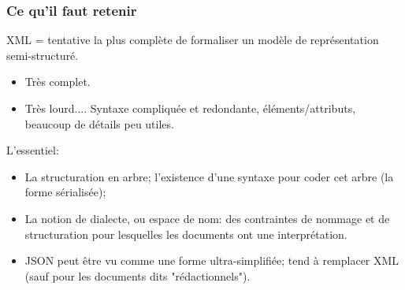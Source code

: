 \begin{frame}[fragile]
\frametitle{Ce qu'il faut retenir}

XML = tentative la plus complète de formaliser un modèle de représentation semi-structuré.

\begin{itemize}
  \item Très complet.
  \item Très lourd....  Syntaxe compliquée et redondante, éléments/attributs, beaucoup de détails peu utiles.
\end{itemize}
  
L'essentiel:

\begin{itemize}
  \item La structuration en arbre; l'existence d'une syntaxe pour coder cet arbre (la forme sérialisée);
  \item La notion de \alert{dialecte}, ou \alert{espace de nom}: des contraintes de nommage
     et de structuration pour lesquelles les documents ont une interprétation.
  \item JSON peut être vu comme une forme ultra-simplifiée; tend à remplacer XML 
         (sauf pour les documents dits "rédactionnels").
\end{itemize}

\end{frame}
